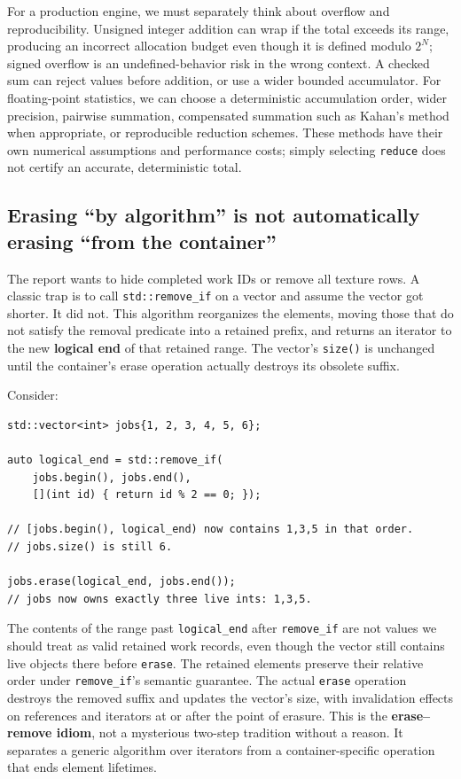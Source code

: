 For a production engine, we must separately think about overflow and reproducibility. Unsigned integer addition can wrap if the total exceeds its range, producing an incorrect allocation budget even though it is defined modulo \(2^N\); signed overflow is an undefined-behavior risk in the wrong context. A checked sum can reject values before addition, or use a wider bounded accumulator. For floating-point statistics, we can choose a deterministic accumulation order, wider precision, pairwise summation, compensated summation such as Kahan's method when appropriate, or reproducible reduction schemes. These methods have their own numerical assumptions and performance costs; simply selecting \texttt{reduce} does not certify an accurate, deterministic total.

\subsection{Erasing ``by algorithm'' is not automatically erasing ``from the container''}\label{05-engine-i-ch006-erasing-by-algorithm-is-not-automatically-erasing-from-the-container}

The report wants to hide completed work IDs or remove all texture rows. A classic trap is to call \texttt{std::remove\_if} on a vector and assume the vector got shorter. It did not. This algorithm reorganizes the elements, moving those that do not satisfy the removal predicate into a retained prefix, and returns an iterator to the new \textbf{logical end} of that retained range. The vector's \texttt{size()} is unchanged until the container's erase operation actually destroys its obsolete suffix.

Consider:

\begin{verbatim}
std::vector<int> jobs{1, 2, 3, 4, 5, 6};

auto logical_end = std::remove_if(
    jobs.begin(), jobs.end(),
    [](int id) { return id % 2 == 0; });

// [jobs.begin(), logical_end) now contains 1,3,5 in that order.
// jobs.size() is still 6.

jobs.erase(logical_end, jobs.end());
// jobs now owns exactly three live ints: 1,3,5.
\end{verbatim}

The contents of the range past \texttt{logical\_end} after \texttt{remove\_if} are not values we should treat as valid retained work records, even though the vector still contains live objects there before \texttt{erase}. The retained elements preserve their relative order under \texttt{remove\_if}'s semantic guarantee. The actual \texttt{erase} operation destroys the removed suffix and updates the vector's size, with invalidation effects on references and iterators at or after the point of erasure. This is the \textbf{erase--remove idiom}, not a mysterious two-step tradition without a reason. It separates a generic algorithm over iterators from a container-specific operation that ends element lifetimes.


